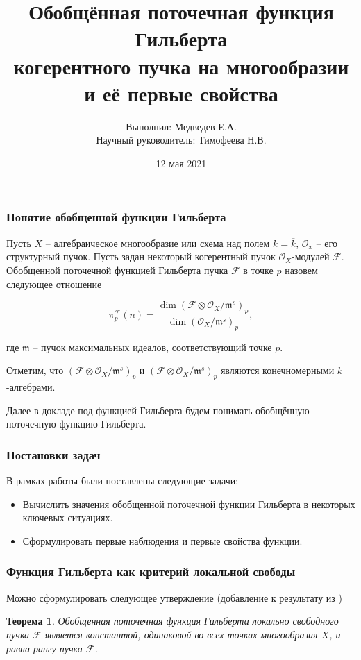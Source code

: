 \documentclass{beamer}
\title{Обобщённая поточечная функция Гильберта \\ когерентного пучка на многообразии и её первые свойства}
\author{Выполнил: Медведев Е.А. \\ Научный руководитель: Тимофеева Н.В.}
\institute{ЯрГУ им. П.Г. Демидова}
\date{12 мая 2021}
\newtheorem{rtheorem}{Теорема}
\newcommand{\ox}{\otimes}
\newcommand{\FF}{\mathcal{F}}
\newcommand{\OO}{\mathcal{O}}
\renewcommand{\bar}[1]{\overline{#1}}
\begin{document}
    \frame[plain]{\titlepage}

    \begin{frame}
        \frametitle{Понятие обобщенной функции Гильберта}
    
        Пусть $X$ -- алгебраическое многообразие или схема над полем $k = \bar{k}$, $\OO_x$ -- его структурный пучок.
        Пусть задан некоторый когерентный пучок $\OO_X$-модулей $\FF$. Обобщенной поточечной функцией Гильберта пучка $\FF$ в точке $p$ назовем следующее отношение

        \begin{equation}
            \pi^{\FF}_p(n) = \frac{\dim (\FF \ox \OO_X / \mathfrak{m}^s)_p}{\dim (\OO_X / \mathfrak{m}^s)_p},
        \end{equation}
    
        где $\mathfrak{m}$ -- пучок максимальных идеалов, соответствующий точке $p$.
        
        Отметим, что $(\FF \ox \OO_X / \mathfrak{m}^s)_p$ и $(\FF \ox \OO_X / \mathfrak{m}^s)_p$ являются конечномерными $k$-алгебрами.

        Далее в докладе под функцией Гильберта будем понимать обобщённую поточечную функцию Гильберта.
    \end{frame}

    \begin{frame}
        \frametitle{Постановки задач}

        В рамках работы были поставлены следующие задачи:
        \begin{itemize}
            \item Вычислить значения обобщенной поточечной функции Гильберта в некоторых ключевых ситуациях.
            \item Сформулировать первые наблюдения и первые свойства функции.
        \end{itemize}
    \end{frame}
    
    \begin{frame}
        \frametitle{Функция Гильберта как критерий локальной свободы}

        Можно сформулировать следующее утверждение (добавление к результату из \cite{Timofeeva})
        \begin{rtheorem}
            Обобщенная поточечная функция Гильберта локально свободного пучка $\FF$ является константой, одинаковой во всех точках многообразия $X$, и равна рангу пучка $\FF$.
        \end{rtheorem}
    \end{frame}
\end{document}
